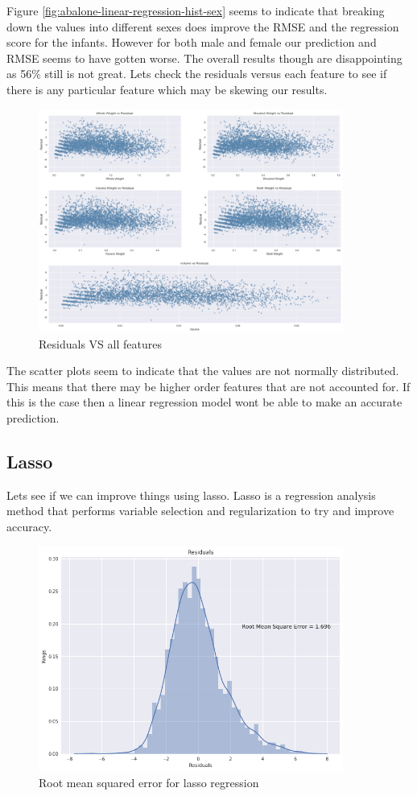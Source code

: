 Figure \ref{fig:abalone-linear-regression-hist-sex} seems to indicate that breaking down the values into different sexes does improve the RMSE and the regression score for the infants. However for both male and female our prediction and RMSE seems to have gotten worse. The overall results though are disappointing as 56\% still is not great. Lets check the residuals versus each feature to see if there is any particular feature which may be skewing our results.
\begin{figure}[H]
  \centering
  \includegraphics[scale=0.5,width=100mm]{./images/abalone-residuals-vs-features.png}
  \caption{Residuals VS all features}
  \label{fig:abalone-residuals-vs-features}
\end{figure}
The scatter plots seem to indicate that the values are not normally distributed. This means that there may be higher order features that are not accounted for. If this is the case then a linear regression model wont be able to make an accurate prediction. 

\subsection{Lasso}

Lets see if we can improve things using lasso. Lasso is a regression analysis method that performs variable selection and regularization to try and improve accuracy.

\begin{figure}[H]
  \centering
  \includegraphics[scale=0.5,width=100mm]{./images/abalone-lasso-regression.png}
  \caption{Root mean squared error for lasso regression}
  \label{fig:abalone-lasso-regression}
\end{figure}

